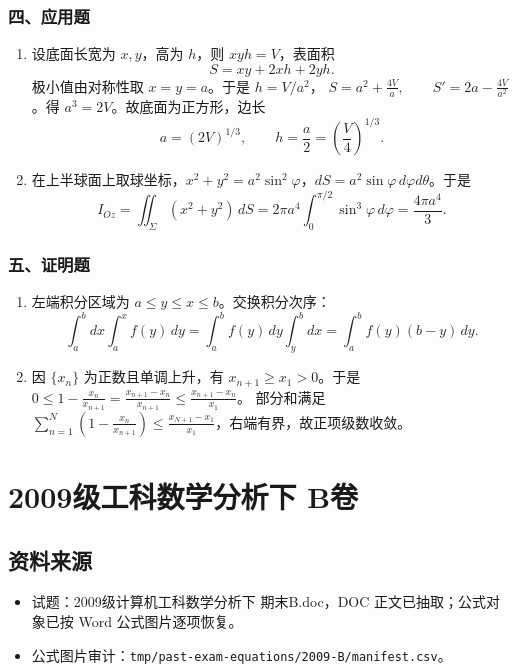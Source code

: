 \subsubsection*{四、应用题}
\begin{enumerate}
  \item 设底面长宽为 $x,y$，高为 $h$，则 $xyh=V$，表面积
  \[
  S=xy+2xh+2yh.
  \]
  极小值由对称性取 $x=y=a$。于是 $h=V/a^2$，
  \(\displaystyle S=a^2+\frac{4V}{a},\qquad S'=2a-\frac{4V}{a^2}\)。得 $a^3=2V$。故底面为正方形，边长
  \[
  a=(2V)^{1/3},\qquad h=\frac a2=\left(\frac V4\right)^{1/3}.
  \]
  \item 在上半球面上取球坐标，$x^2+y^2=a^2\sin^2\varphi$，$dS=a^2\sin\varphi\,d\varphi d\theta$。于是
  \[
  I_{Oz}=\iint_\Sigma(x^2+y^2)\,dS
  =2\pi a^4\int_0^{\pi/2}\sin^3\varphi\,d\varphi
  =\frac{4\pi a^4}{3}.
  \]
\end{enumerate}

\subsubsection*{五、证明题}
\begin{enumerate}
  \item 左端积分区域为 $a\le y\le x\le b$。交换积分次序：
  \[
  \int_a^b dx\int_a^x f(y)\,dy
  =\int_a^b f(y)\,dy\int_y^b dx
  =\int_a^b f(y)(b-y)\,dy.
  \]
  \item 因 $\{x_n\}$ 为正数且单调上升，有 $x_{n+1}\ge x_1>0$。于是
  \(\displaystyle 0\le1-\frac{x_n}{x_{n+1}}
  =\frac{x_{n+1}-x_n}{x_{n+1}}
  \le\frac{x_{n+1}-x_n}{x_1}\)。
  部分和满足
  \(\displaystyle \sum_{n=1}^N\left(1-\frac{x_n}{x_{n+1}}\right)\le\frac{x_{N+1}-x_1}{x_1}\)，右端有界，故正项级数收敛。
\end{enumerate}

\section{2009级工科数学分析下 B卷}

\subsection{资料来源}
\begin{itemize}
  \item 试题：2009级计算机工科数学分析下 期末B.doc，DOC 正文已抽取；公式对象已按 Word 公式图片逐项恢复。
  \item 公式图片审计：\texttt{tmp/past-exam-equations/2009-B/manifest.csv}。
\end{itemize}

